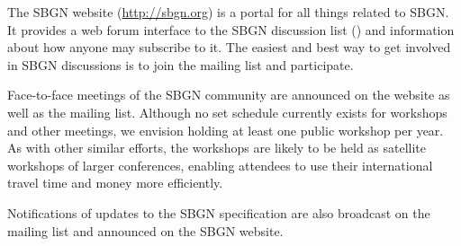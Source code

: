 The SBGN website (\url{http://sbgn.org}) is a portal for all things related to SBGN.  It provides a web forum interface to the SBGN discussion list () and information about how anyone may subscribe to it.  The easiest and best way to get involved in SBGN discussions is to join the mailing list and participate.

Face-to-face meetings of the SBGN community are announced on the website as well as the mailing list.  Although no set schedule currently exists for workshops and other meetings, we envision holding at least one public workshop per year.  As with other similar efforts, the workshops are likely to be held as satellite workshops of larger conferences, enabling attendees to use their international travel time and money more efficiently.

Notifications of updates to the SBGN specification are also broadcast on the mailing list and announced on the SBGN website.
